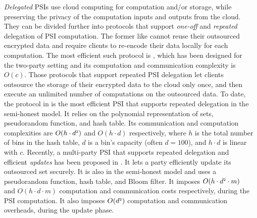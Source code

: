  \textit{Delegated} PSIs use  cloud computing  for computation and/or storage, while preserving the privacy of  the computation inputs and outputs from the cloud. They can be divided further into protocols that support \textit{one-off} and \textit{repeated} delegation of PSI computation. The former like \cite{kamarascaling,kerschbaum12} cannot reuse their outsourced encrypted data and require clients to re-encode their data locally for each  computation. The most efficient such protocol is \cite{kamarascaling}, which has been designed for the two-party setting and its computation and communication complexity is $O(c)$.  Those protocols that support repeated PSI delegation let clients outsource the storage of their encrypted data to the cloud only once, and then execute an unlimited number of computations on the outsourced data. 
To date, the protocol in \cite{eopsi} is the most efficient PSI that supports repeated delegation in the semi-honest model. It relies on the polynomial representation of sets, pseudorandom function, and hash table. Its communication and computation complexities are $O(h\cdot d^{\scriptscriptstyle 2})$ and $O(h\cdot d)$ respectively, where $h$ is the total number of bins in the hash table, $d$ is a bin's capacity (often $d=100$), and $h\cdot d$ is linear with $c$.  Recently, a multi-party PSI that supports repeated delegation and efficient \emph{updates} has been proposed in \cite{AbadiDMT22}. It lets a party efficiently update its outsourced set securely. It is also in the semi-honest model and uses a pseudorandom function, hash table, and Bloom filter. It imposes $O(h\cdot d^{\scriptscriptstyle 2}\cdot m)$ and $O(h\cdot d\cdot m)$  computation and communication costs respectively, during the PSI computation. It also imposes $O(d^{\scriptscriptstyle 2})$  computation and communication overheads, during the update phase.  








 
 
 